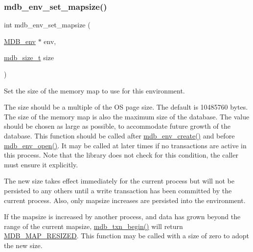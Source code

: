 \subsubsection{\texorpdfstring{mdb\+\_\+env\+\_\+set\+\_\+mapsize()}{mdb\_env\_set\_mapsize()}}
{\footnotesize\ttfamily int mdb\+\_\+env\+\_\+set\+\_\+mapsize (\begin{DoxyParamCaption}\item[{\mbox{\hyperlink{struct_m_d_b__env}{M\+D\+B\+\_\+env}} $\ast$}]{env,  }\item[{\mbox{\hyperlink{lmdb_8h_a78821971e612e3898ef4b3ae45ed86f1}{mdb\+\_\+size\+\_\+t}}}]{size }\end{DoxyParamCaption})}



Set the size of the memory map to use for this environment. 

The size should be a multiple of the OS page size. The default is 10485760 bytes. The size of the memory map is also the maximum size of the database. The value should be chosen as large as possible, to accommodate future growth of the database. This function should be called after \mbox{\hyperlink{group__mdb_gaad6be3d8dcd4ea01f8df436f41d158d4}{mdb\+\_\+env\+\_\+create()}} and before \mbox{\hyperlink{group__mdb_ga32a193c6bf4d7d5c5d579e71f22e9340}{mdb\+\_\+env\+\_\+open()}}. It may be called at later times if no transactions are active in this process. Note that the library does not check for this condition, the caller must ensure it explicitly.

The new size takes effect immediately for the current process but will not be persisted to any others until a write transaction has been committed by the current process. Also, only mapsize increases are persisted into the environment.

If the mapsize is increased by another process, and data has grown beyond the range of the current mapsize, \mbox{\hyperlink{group__mdb_gad7ea55da06b77513609efebd44b26920}{mdb\+\_\+txn\+\_\+begin()}} will return \mbox{\hyperlink{group__errors_ga75c014faa4f02ffd234a5ee0e14baa92}{M\+D\+B\+\_\+\+M\+A\+P\+\_\+\+R\+E\+S\+I\+Z\+ED}}. This function may be called with a size of zero to adopt the new size.

